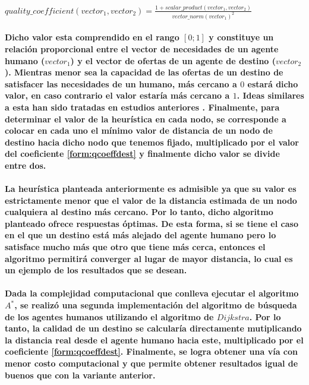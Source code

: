 \documentclass[12pt]{amsart}
\begin{document}
\paragraph{$quality\_coefficient(vector_1, vector_2) = \frac{1 + scalar\_product(vector_1, vector_2)}{vector\_norm(vector_1)^2}$\label{form:qcoeffdest}}

\paragraph{Dicho valor esta comprendido en el rango $[0 ; 1]$ y constituye un relación proporcional entre el vector de necesidades de un agente humano ($vector_1$) y el vector de ofertas de un agente de destino ($vector_2$). Mientras menor sea la capacidad de las ofertas de un destino de satisfacer las necesidades de un humano, más cercano a $0$ estará dicho valor, en caso contrario el valor estaría más cercano a $1$. Ideas similares a esta han sido tratadas en estudios anteriores \cite{soa5}. Finalmente, para determinar el valor de la heurística en cada nodo, se corresponde a colocar en cada uno el mínimo valor de distancia de un nodo de destino hacia dicho nodo que tenemos fijado, multiplicado por el valor del coeficiente \ref{form:qcoeffdest} y finalmente dicho valor se divide entre dos.}

\paragraph{La heurística planteada anteriormente es admisible ya que su valor es estrictamente menor que el valor de la distancia estimada de un nodo cualquiera al destino más cercano. Por lo tanto, dicho algoritmo planteado ofrece respuestas óptimas. De esta forma, si se tiene el caso en el que un destino está más alejado del agente humano pero lo satisface mucho más que otro que tiene más cerca, entonces el algoritmo permitirá converger al lugar de mayor distancia, lo cual es un ejemplo de los resultados que se desean.}

\paragraph{Dada la complejidad computacional que conlleva ejecutar el algoritmo $A^*$, se realizó una segunda implementación del algoritmo de búsqueda de los agentes humanos utilizando el algoritmo de $Dijkstra$. Por lo tanto, la calidad de un destino se calcularía directamente mutiplicando la distancia real desde el agente humano hacia este, multiplicado por el coeficiente \ref{form:qcoeffdest}. Finalmente, se logra obtener una vía con menor costo computacional y que permite obtener resultados igual de buenos que con la variante anterior.}
\end{document}
